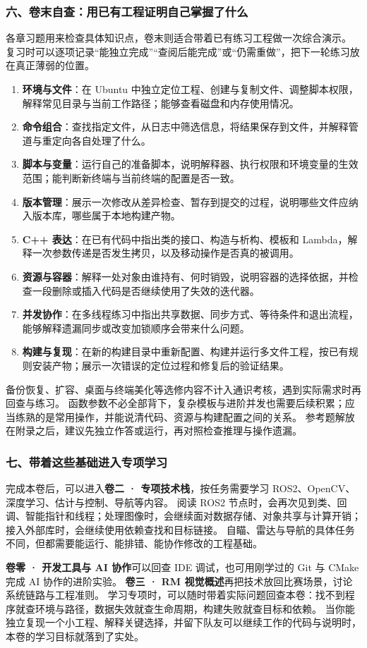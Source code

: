 \subsubsection*{六、卷末自查：用已有工程证明自己掌握了什么}

各章习题用来检查具体知识点，卷末则适合带着已有练习工程做一次综合演示。
复习时可以逐项记录“能独立完成”“查阅后能完成”或“仍需重做”，把下一轮练习放在真正薄弱的位置。
\begin{enumerate}
    \item \textbf{环境与文件}：在 Ubuntu 中独立定位工程、创建与复制文件、调整脚本权限，解释常见目录与当前工作路径；能够查看磁盘和内存使用情况。
    \item \textbf{命令组合}：查找指定文件，从日志中筛选信息，将结果保存到文件，并解释管道与重定向各自处理了什么。
    \item \textbf{脚本与变量}：运行自己的准备脚本，说明解释器、执行权限和环境变量的生效范围；能判断新终端与当前终端的配置是否一致。
    \item \textbf{版本管理}：展示一次修改从差异检查、暂存到提交的过程，说明哪些文件应纳入版本库，哪些属于本地构建产物。
    \item \textbf{C++ 表达}：在已有代码中指出类的接口、构造与析构、模板和 Lambda，解释一次参数传递是否发生拷贝，以及移动操作是否真的被调用。
    \item \textbf{资源与容器}：解释一处对象由谁持有、何时销毁，说明容器的选择依据，并检查一段删除或插入代码是否继续使用了失效的迭代器。
    \item \textbf{并发协作}：在多线程练习中指出共享数据、同步方式、等待条件和退出流程，能够解释遗漏同步或改变加锁顺序会带来什么问题。
    \item \textbf{构建与复现}：在新的构建目录中重新配置、构建并运行多文件工程，按已有规则安装产物；展示一次错误的定位过程和修复后的验证结果。
\end{enumerate}
备份恢复、扩容、桌面与终端美化等选修内容不计入通识考核，遇到实际需求时再回查与练习。
函数参数不必全部背下，复杂模板与进阶并发也需要后续积累；应当练熟的是常用操作，并能说清代码、资源与构建配置之间的关系。
参考题解放在附录之后，建议先独立作答或运行，再对照检查推理与操作遗漏。

\subsubsection*{七、带着这些基础进入专项学习}

完成本卷后，可以进入\textbf{卷二 · 专项技术栈}，按任务需要学习 ROS2、OpenCV、深度学习、估计与控制、导航等内容。
阅读 ROS2 节点时，会再次见到类、回调、智能指针和线程；处理图像时，会继续面对数据存储、对象共享与计算开销；接入外部库时，会继续使用依赖查找和目标链接。
自瞄、雷达与导航的具体任务不同，但都需要能运行、能排错、能协作修改的工程基础。

\textbf{卷零 · 开发工具与 AI 协作}可以回查 IDE 调试，也可用刚学过的 Git 与 CMake 完成 AI 协作的进阶实验。
\textbf{卷三 · RM 视觉概述}再把技术放回比赛场景，讨论系统链路与工程准则。
学习专项时，可以随时带着实际问题回查本卷：找不到程序就查环境与路径，数据失效就查生命周期，构建失败就查目标和依赖。
当你能独立复现一个小工程、解释关键选择，并留下队友可以继续工作的代码与说明时，本卷的学习目标就落到了实处。
\par
\endgroup
